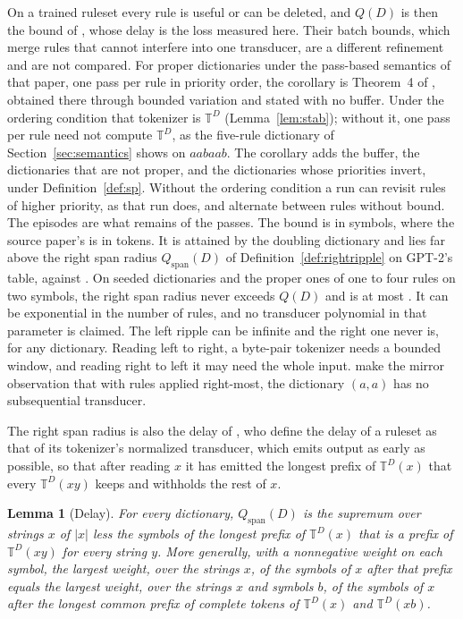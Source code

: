 \documentclass[11pt,a4paper]{article}
\theoremstyle{definition}
\theoremstyle{plain}
\newtheorem{lemma}{Lemma}
\newcommand{\T}{\mathbb{T}}
\begin{document}
On a trained ruleset every rule is useful or can be deleted, and \(Q(D)\) is then the bound of \citet{mamouras2026bpe},
whose delay is the loss measured here. Their batch bounds, which merge rules that cannot interfere into one transducer,
are a different refinement and are not compared. For proper dictionaries under the pass-based semantics of that paper,
one pass per rule in priority order, the corollary is Theorem~4 of \citet{berglund2024dfa}, obtained there through
bounded variation and stated with no buffer. Under the ordering condition that tokenizer is \(\T^D\)
(Lemma~\ref{lem:stab}); without it, one pass per rule need not compute \(\T^D\), as the five-rule dictionary of
Section~\ref{sec:semantics} shows on \(aabaab\). The corollary adds the buffer, the dictionaries that are not proper,
and the dictionaries whose priorities invert, under Definition~\ref{def:sp}. Without the ordering condition a run can
revisit rules of higher priority, as that run does, and alternate between rules without bound. The episodes are what
remains of the passes. The bound is in symbols, where the source paper's is in tokens. It is attained by the doubling
dictionary and lies far above the right span radius \(Q_{\mathrm{span}}(D)\) of Definition~\ref{def:rightripple} on
GPT-2's table, \ChainGptQspan{} against \ChainGptQD{}. On \LookaheadSeeded{} seeded dictionaries and the
\LookaheadCensus{} proper ones of one to four rules on two symbols, the right span radius never exceeds \(Q(D)\) and is
at most \LookaheadMaxRadius{}. It can be exponential in the number of rules, and no transducer polynomial in that
parameter is claimed. The left ripple can be infinite and the right one never is, for any dictionary. Reading left to
right, a byte-pair tokenizer needs a bounded window, and reading right to left it may need the whole input.
\citet[Example~8]{berglund2024dfa} make the mirror observation that with rules applied right-most, the dictionary
\((a, a)\) has no subsequential transducer.

The right span radius is also the delay of \citet{mamouras2026bpe}, who define the delay of a ruleset as that of its
tokenizer's normalized transducer, which emits output as early as possible, so that after reading \(x\) it has emitted
the longest prefix of \(\T^D(x)\) that every \(\T^D(xy)\) keeps and withholds the rest of \(x\).

\begin{lemma}[Delay]\label{lem:delay}
For every dictionary, \(Q_{\mathrm{span}}(D)\) is the supremum over strings \(x\) of \(|x|\) less the symbols of the
longest prefix of \(\T^D(x)\) that is a prefix of \(\T^D(xy)\) for every string \(y\). More generally, with a
nonnegative weight on each symbol, the largest weight, over the strings \(x\), of the symbols of \(x\) after that prefix
equals the largest weight, over the strings \(x\) and symbols \(b\), of the symbols of \(x\) after the longest common
prefix of complete tokens of \(\T^D(x)\) and \(\T^D(xb)\).
\end{lemma}
\end{document}
